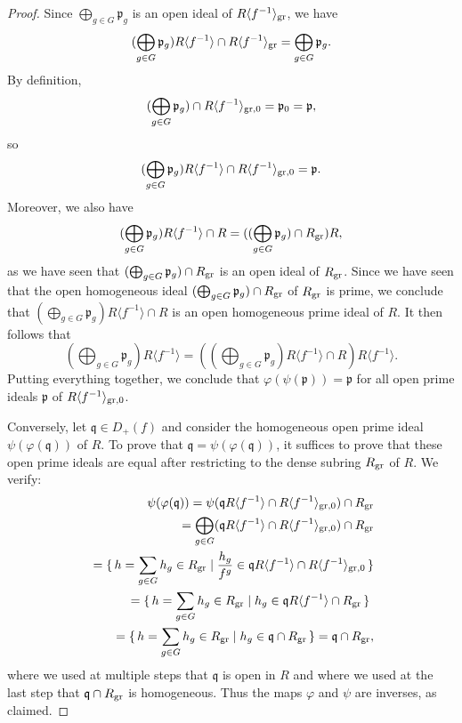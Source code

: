 \documentclass[12pt,twoside,a4paper]{article}
\theoremstyle{definition}
\theoremstyle{remark}
\newcommand\gr{{\rm gr}}
\begin{document}
\begin{proof}
Since $\bigoplus_{g\in G}\mathfrak{p}_{g}$ is an open ideal of $R\langle f^{-1}\rangle_{\gr}$, we have \begin{equation*}(\bigoplus_{g\in G}\mathfrak{p}_{g})R\langle f^{-1}\rangle\cap R\langle f^{-1}\rangle_{\gr}=\bigoplus_{g\in G}\mathfrak{p}_{g}.\end{equation*}By definition, \begin{equation*}(\bigoplus_{g\in G}\mathfrak{p}_{g})\cap R\langle f^{-1}\rangle_{\gr, 0}=\mathfrak{p}_{0}=\mathfrak{p},\end{equation*}so \begin{equation*}(\bigoplus_{g\in G}\mathfrak{p}_{g})R\langle f^{-1}\rangle\cap R\langle f^{-1}\rangle_{\gr, 0}=\mathfrak{p}.\end{equation*}Moreover, we also have \begin{equation*}(\bigoplus_{g\in G}\mathfrak{p}_{g})R\langle f^{-1}\rangle\cap R=((\bigoplus_{g\in G}\mathfrak{p}_{g})\cap R_{\gr})R,\end{equation*}as we have seen that $(\bigoplus_{g\in G}\mathfrak{p}_{g})\cap R_{\gr}$ is an open ideal of $R_{\gr}$. Since we have seen that the open homogeneous ideal $(\bigoplus_{g\in G}\mathfrak{p}_{g})\cap R_{\gr}$ of $R_{\gr}$ is prime, we conclude that $(\bigoplus_{g\in G}\mathfrak{p}_{g})R\langle f^{-1}\rangle\cap R$ is an open homogeneous prime ideal of $R$. It then follows that \begin{equation*}(\bigoplus_{g\in G}\mathfrak{p}_{g})R\langle f^{-1}\rangle=((\bigoplus_{g\in G}\mathfrak{p}_{g})R\langle f^{-1}\rangle\cap R)R\langle f^{-1}\rangle.\end{equation*}Putting everything together, we conclude that $\varphi(\psi(\mathfrak{p}))=\mathfrak{p}$ for all open prime ideals $\mathfrak{p}$ of $R\langle f^{-1}\rangle_{\gr,0}$. 

Conversely, let $\mathfrak{q}\in D_{+}(f)$ and consider the homogeneous open prime ideal $\psi(\varphi(\mathfrak{q}))$ of $R$. To prove that $\mathfrak{q}=\psi(\varphi(\mathfrak{q}))$, it suffices to prove that these open prime ideals are equal after restricting to the dense subring $R_{\gr}$ of $R$. We verify: \begin{align*}\psi(\varphi(\mathfrak{q}))=\psi(\mathfrak{q}R\langle f^{-1}\rangle\cap R\langle f^{-1}\rangle_{\gr,0})\cap R_{\gr} \\ =\bigoplus_{g\in G}(\mathfrak{q}R\langle f^{-1}\rangle\cap R\langle f^{-1}\rangle_{\gr,0})\cap R_{\gr} \\ =\{\, h=\sum_{g\in G}h_{g}\in R_{\gr}\mid \frac{h_{g}}{f^{g}}\in \mathfrak{q}R\langle f^{-1}\rangle\cap R\langle f^{-1}\rangle_{\gr,0}\,\} \\ =\{\, h=\sum_{g\in G}h_{g}\in R_{\gr}\mid h_{g}\in \mathfrak{q}R\langle f^{-1}\rangle \cap R_{\gr}\,\} \\ =\{\, h=\sum_{g\in G}h_{g}\in R_{\gr}\mid h_{g}\in \mathfrak{q}\cap R_{\gr}\,\}=\mathfrak{q}\cap R_{\gr},\end{align*}where we used at multiple steps that $\mathfrak{q}$ is open in $R$ and where we used at the last step that $\mathfrak{q}\cap R_{\gr}$ is homogeneous. Thus the maps $\varphi$ and $\psi$ are inverses, as claimed. 


\end{proof}
\end{document}
